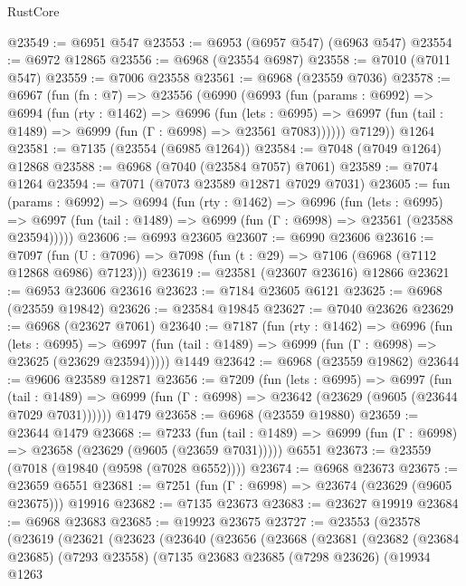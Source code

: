 \begin{lexlean}{RustCore}
\begin{coremodule}
@23549 := @6951 @547
@23553 := @6953 (@6957 @547) (@6963 @547)
@23554 := @6972 @12865
@23556 := @6968 (@23554 @6987)
@23558 := @7010 (@7011 @547)
@23559 := @7006 @23558
@23561 := @6968 (@23559 @7036)
@23578 := @6967
    (fun (fn : @7) =>
    @23556
      (@6990
        (@6993
          (fun (params : @6992) =>
          @6994
            (fun (rty : @1462) =>
            @6996
              (fun (lets : @6995) =>
              @6997 (fun (tail : @1489) => @6999 (fun (Γ : @6998) => @23561 @7083))))))
        @7129))
    @1264
@23581 := @7135 (@23554 (@6985 @1264))
@23584 := @7048 (@7049 @1264) @12868
@23588 := @6968 (@7040 (@23584 @7057) @7061)
@23589 := @7074 @1264
@23594 := @7071 (@7073 @23589 @12871 @7029 @7031)
@23605 := fun (params : @6992) =>
  @6994
    (fun (rty : @1462) =>
    @6996
      (fun (lets : @6995) =>
      @6997 (fun (tail : @1489) => @6999 (fun (Γ : @6998) => @23561 (@23588 @23594)))))
@23606 := @6993 @23605
@23607 := @6990 @23606
@23616 := @7097
    (fun (U : @7096) => @7098 (fun (t : @29) => @7106 (@6968 (@7112 @12868 @6986) @7123)))
@23619 := @23581 (@23607 @23616) @12866
@23621 := @6953 @23606 @23616
@23623 := @7184 @23605 @6121
@23625 := @6968 (@23559 @19842)
@23626 := @23584 @19845
@23627 := @7040 @23626
@23629 := @6968 (@23627 @7061)
@23640 := @7187
    (fun (rty : @1462) =>
    @6996
      (fun (lets : @6995) =>
      @6997 (fun (tail : @1489) => @6999 (fun (Γ : @6998) => @23625 (@23629 @23594)))))
    @1449
@23642 := @6968 (@23559 @19862)
@23644 := @9606 @23589 @12871
@23656 := @7209
    (fun (lets : @6995) =>
    @6997
      (fun (tail : @1489) =>
      @6999 (fun (Γ : @6998) => @23642 (@23629 (@9605 (@23644 @7029 @7031))))))
    @1479
@23658 := @6968 (@23559 @19880)
@23659 := @23644 @1479
@23668 := @7233
    (fun (tail : @1489) => @6999 (fun (Γ : @6998) => @23658 (@23629 (@9605 (@23659 @7031)))))
    @6551
@23673 := @23559 (@7018 (@19840 (@9598 (@7028 @6552))))
@23674 := @6968 @23673
@23675 := @23659 @6551
@23681 := @7251 (fun (Γ : @6998) => @23674 (@23629 (@9605 @23675))) @19916
@23682 := @7135 @23673
@23683 := @23627 @19919
@23684 := @6968 @23683
@23685 := @19923 @23675
@23727 := @23553
    (@23578
      (@23619
        (@23621
          (@23623
            (@23640
              (@23656
                (@23668
                  (@23681
                    (@23682
                      (@23684 @23685)
                      (@7293 @23558)
                      (@7135
                        @23683
                        @23685
                        (@7298 @23626)
                        (@19934
                          @1263

\end{coremodule}
\end{lexlean}
